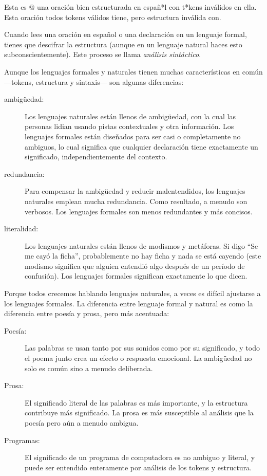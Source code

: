 Esta es @ una oración bien estructurada en españ*l con t*kens inválidos en ella. Esta oración todos tokens válidos tiene, pero estructura inválida con.

Cuando lees una oración en español o una declaración en un lenguaje formal, tienes que descifrar la estructura (aunque en un lenguaje natural haces esto subconscientemente). Este proceso se llama \textit{análisis sintáctico}.

Aunque los lenguajes formales y naturales tienen muchas características en común ---tokens, estructura y sintaxis--- son algunas diferencias:

\begin{description}
\item[ambigüedad:] Los lenguajes naturales están llenos de ambigüedad, con la cual las personas lidian usando pistas contextuales y otra información. Los lenguajes formales están diseñados para ser casi o completamente no ambiguos, lo cual significa que cualquier declaración tiene exactamente un significado, independientemente del contexto.

\item[redundancia:] Para compensar la ambigüedad y reducir malentendidos, los lenguajes naturales emplean mucha redundancia. Como resultado, a menudo son verbosos. Los lenguajes formales son menos redundantes y más concisos.

\item[literalidad:] Los lenguajes naturales están llenos de modismos y metáforas. Si digo ``Se me cayó la ficha'', probablemente no hay ficha y nada se está cayendo (este modismo significa que alguien entendió algo después de un período de confusión). Los lenguajes formales significan exactamente lo que dicen.
\end{description}

Porque todos crecemos hablando lenguajes naturales, a veces es difícil ajustarse a los lenguajes formales. La diferencia entre lenguaje formal y natural es como la diferencia entre poesía y prosa, pero más acentuada:

\begin{description}
\item[Poesía:] Las palabras se usan tanto por sus sonidos como por su significado, y todo el poema junto crea un efecto o respuesta emocional. La ambigüedad no solo es común sino a menudo deliberada.

\item[Prosa:] El significado literal de las palabras es más importante, y la estructura contribuye más significado. La prosa es más susceptible al análisis que la poesía pero aún a menudo ambigua.

\item[Programas:] El significado de un programa de computadora es no ambiguo y literal, y puede ser entendido enteramente por análisis de los tokens y estructura.
\end{description}

